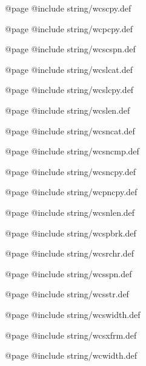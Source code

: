 @page
@include string/wcscpy.def

@page
@include string/wcpcpy.def

@page
@include string/wcscspn.def

@page
@include string/wcslcat.def

@page
@include string/wcslcpy.def

@page
@include string/wcslen.def

@page
@include string/wcsncat.def

@page
@include string/wcsncmp.def

@page
@include string/wcsncpy.def

@page
@include string/wcpncpy.def

@page
@include string/wcsnlen.def

@page
@include string/wcspbrk.def

@page
@include string/wcsrchr.def

@page
@include string/wcsspn.def

@page
@include string/wcsstr.def

@page
@include string/wcswidth.def

@page
@include string/wcsxfrm.def

@page
@include string/wcwidth.def

